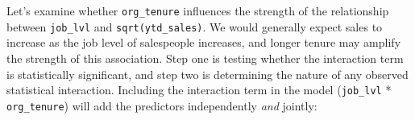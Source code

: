 \documentclass[
]{book}
\begin{document}
Let's examine whether \texttt{org\_tenure} influences the strength of the relationship between \texttt{job\_lvl} and \texttt{sqrt(ytd\_sales)}. We would generally expect sales to increase as the job level of salespeople increases, and longer tenure may amplify the strength of this association. Step one is testing whether the interaction term is statistically significant, and step two is determining the nature of any observed statistical interaction. Including the interaction term in the model (\texttt{job\_lvl} * \texttt{org\_tenure}) will add the predictors independently \emph{and} jointly:

\providecommand{\docline}[3]{\noalign{\global\setlength{\arrayrulewidth}{#1}}\arrayrulecolor[HTML]{#2}\cline{#3}}

\setlength{\tabcolsep}{2pt}

\renewcommand*{\arraystretch}{1.5}
\end{document}
